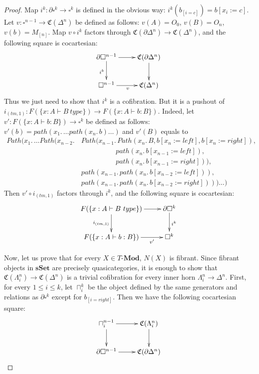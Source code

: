 \documentclass[reqno]{amsart}
\theoremstyle{definition}
\theoremstyle{remark}
\newcommand{\repl}{:=}
\newcommand{\cat}[1]{\mathbf{#1}}
\newcommand{\Mod}[1]{#1\text{-}\cat{Mod}}
\newcommand{\sSet}{\cat{sSet}}
\numberwithin{figure}{section}
\begin{document}
\begin{proof}
Map $i^k : \partial \square^k \to \square^k$ is defined in the obvious way: $i^k(b_{[i=c]}) = b[x_i \repl c]$.
Let $v : \square^{n-1} \to \mathfrak{C}(\Delta^n)$ be defined as follows: $v(A) = O_0$, $v(B) = O_n$, $v(b) = M_{[n]}$.
Map $v \circ i^k$ factors through $\mathfrak{C}(\partial \Delta^n) \to \mathfrak{C}(\Delta^n)$, and the following square is cocartesian:
\[ \xymatrix{ \partial \square^{n-1} \ar[r] \ar[d]_{i^k} & \mathfrak{C}(\partial \Delta^n) \ar[d] \\
              \square^{n-1} \ar[r]_v & \mathfrak{C}(\Delta^n)
            } \]
Thus we just need to show that $i^k$ is a cofibration.
But it is a pushout of $i_{(tm,1)} : F(\{ x : A \vdash B\ type \}) \to F(\{ x : A \vdash b : B \})$.
Indeed, let $v' : F(\{ x : A \vdash b : B \}) \to \square^k$ be defined as follows: $v'(b) = path(x_1.\,\ldots path(x_n.\,b) \ldots)$ and $v'(B)$ equals to
\begin{align*}
Path(x_1.\, \ldots Path(x_{n-2}.\, & Path(x_{n-1}.\,     Path(x_n.\,B, b[x_n \repl left], b[x_n \repl right]), \\
                                   & \qquad \qquad \quad path(x_n.\,b[x_{n-1} \repl left]), \\
                                   & \qquad \qquad \quad path(x_n.\,b[x_{n-1} \repl right])), \\
                                   & path(x_{n-1}.\,     path(x_n.\,b[x_{n-2} \repl left])), \\
                                   & path(x_{n-1}.\,     path(x_n.\,b[x_{n-2} \repl right]))) \ldots )
\end{align*}
Then $v' \circ i_{(tm,1)}$ factors through $i^k$, and the following square is cocartesian:
\[ \xymatrix{ F(\{ x : A \vdash B\ type \}) \ar[r] \ar[d]_{i_{(tm,1)}} & \partial \square^k \ar[d]^{i^k} \\
              F(\{ x : A \vdash b : B \}) \ar[r]_-{v'} & \square^k
            } \]

Now, let us prove that for every $X \in \Mod{T}$, $N(X)$ is fibrant.
Since fibrant objects in $\sSet$ are precisely quasicategories,
it is enough to show that $\mathfrak{C}(\Lambda^n_i) \to \mathfrak{C}(\Delta^n)$ is a trivial cofibration for every inner horn $\Lambda^n_i \to \Delta^n$.
First, for every $1 \leq i \leq k$, let $\sqcap^k_i$ be the object defined by the same generators and relations as $\partial \square^k$ except for $b_{[i=right]}$.
Then we have the following cocartesian square:
\[ \xymatrix{ \sqcap^{n-1}_i \ar[r] \ar[d] & \mathfrak{C}(\Lambda^n_i) \ar[d] \\
              \partial \square^{n-1} \ar[r] & \mathfrak{C}(\partial \Delta^n)
            } \]


\end{proof}
\end{document}
